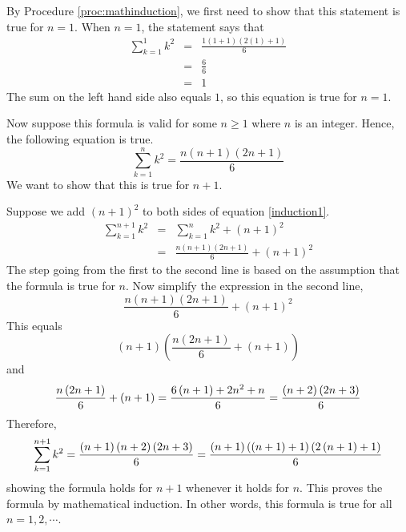 \begin{solution}
By Procedure \ref{proc:mathinduction}, we first need to show that this statement is true for $n=1$.
When $n=1$, the statement says that 
\begin{eqnarray*}
\sum_{k=1}^{1}k^{2}&=&\frac{1\left( 1+1\right) \left( 2(1)+1\right) }{6}\\
&=&\frac{6}{6} \\
&=& 1
\end{eqnarray*}
The sum on the left hand side also equals $1$, so this equation is true for $n=1$.

Now suppose this formula is valid for some $n\geq
1$ where $n$ is an integer. Hence, the following equation is true.
\begin{equation}
\sum_{k=1}^{n}k^{2}=
\frac{n\left( n+1\right) \left( 2n+1\right) }{6}
\label{induction1}
\end{equation}
We want to show that this is true for $n+1$. 

Suppose we add $(n+1)^2$ to both sides of equation \ref{induction1}.
\begin{eqnarray*}
\sum_{k=1}^{n+1}k^{2}&=&\sum_{k=1}^{n}k^{2}+\left( n+1\right) ^{2} \\
&=&\frac{n\left( n+1\right) \left( 2n+1\right) }{6}+\left( n+1\right) ^{2}
\end{eqnarray*}
The step going from the first to the second line is based on the assumption
that the formula is true for $n.$
Now simplify the expression in the second line,
\begin{equation*}
\frac{n\left( n+1\right) \left( 2n+1\right) }{6}+\left( n+1\right) ^{2}
\end{equation*}
This equals
\begin{equation*}
\left( n+1\right) \left( \frac{n\left( 2n+1\right) }{6}+\left( n+1\right)
\right)
\end{equation*}
and
\begin{equation*}
\frac{n\left( 2n+1\right) }{6}+\left( n+1\right) =\frac{6\left( n+1\right)
+2n^{2}+n}{6}=\frac{\allowbreak \left( n+2\right) \left( 2n+3\right) }{6}
\end{equation*}
Therefore,
\begin{equation*}
\sum_{k=1}^{n+1}k^{2}=\frac{\allowbreak \left( n+1\right) \left( n+2\right)
\left( 2n+3\right) }{6}=\frac{\allowbreak \left( n+1\right) \left( \left(
n+1\right) +1\right) \left( 2\left( n+1\right) +1\right) }{6}
\end{equation*}
showing the formula holds for $n+1$ whenever it holds for $n.$ This proves
the formula by mathematical induction. In other words, this formula is true for all $n = 1, 2, \cdots$.
\end{solution}

